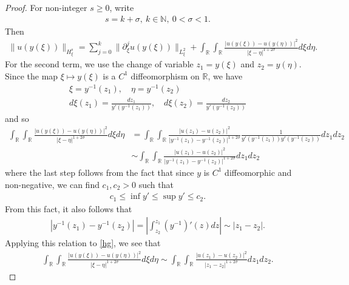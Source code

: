 \documentclass[12pt,reqno]{amsart}
\numberwithin{equation}{section}  %
\numberwithin{figure}{section}
\newcommand{\rr}{\mathbb{R}}
\newcommand{\p}{\partial}
\begin{document}
\begin{proof}
For non-integer $s \ge 0$, write
%
%
\begin{equation*}
\begin{split}
  s = k + \sigma, \ k \in \mathbb{N}, \ 0 < \sigma < 1. 
\end{split}
\end{equation*}
%
%
Then 
%
%
\begin{equation*}
\begin{split}
  \| u(y(\xi)) \|_{H^{s}_{\xi}} = \sum_{j = 0}^{k} \| \p_{\xi}^{j} u (y(\xi))
  \|_{L^{2}_{\xi}} + \int_{\rr} \int_{\rr} \frac{| u(y(\xi)) - u(y(\eta))
    |^{2}}{| \xi - \eta |^{1 + 2 \sigma}} d \xi d \eta.
\end{split}
\end{equation*}
%
%
For the second term, we use the change of variable $z_{1} = y(\xi)$ and $z_{2} = y(\eta)$. Since the map $\xi \mapsto y(\xi)$ is a $C^{1}$ diffeomorphism on $\rr$, we have
%
%
\begin{gather*}
   \xi= y^{-1}(z_{1}), \quad \eta = y^{-1}(z_{2})
  \\
   d \xi(z_{1}) = \frac{dz_{1}}{y'(y^{-1}(z_{1}))}, \quad d \xi(z_{2}) = \frac{dz_{2}}{y'(y^{-1}(z_{2}))}
\end{gather*}
%
%
and so
%
%
\begin{equation}
  \label{hg}
\begin{split}
\int_{\rr} \int_{\rr} \frac{| u(y(\xi)) - u(y(\eta))
    |^{2}}{| \xi - \eta |^{1 + 2 \sigma}} d \xi d \eta & = \int_{\rr} \int_{\rr}
    \frac{| u(z_{1}) - u(z_{2}) |^{2}}{| y^{-1}(z_{1}) - y^{-1}(z_{2}) |^{1 + 2
    \sigma}} \frac{1}{y'(y^{-1}(z_{1})) y'(y^{-1}(z_{2}))} d z_{1} d z_{2}
    \\
    & \sim \int_{\rr} \int_{\rr} \frac{| u(z_{1}) - u(z_{2}) |^{2}}{|
      y^{-1}(z_{1}) - y^{-1}(z_{2}) |^{1 + 2 \sigma}} d z_{1} dz_{2}
\end{split}
\end{equation}
%
%
where the last step follows from the fact that since $y$ is $C^{1}$
diffeomorphic  and non-negative, we can find $c_{1}, c_{2} > 0$ such that
%
%
\begin{equation*}
\begin{split}
  c_{1} \le \inf y' \le \sup y' \le c_{2}.
\end{split}
\end{equation*}
%
%
From this fact, it also follows that
%
%
\begin{equation*}
\begin{split}
  | y^{-1}(z_{1}) - y^{-1}(z_{2}) | = | \int_{z_{2}}^{z_{1}} (y^{-1})'(z) dz | \sim | z_{1} - z_{2} |.
\end{split}
\end{equation*}
%
%
Applying this relation to \eqref{hg}, we see that
%
%
\begin{equation*}
\begin{split}
\int_{\rr} \int_{\rr} \frac{| u(y(\xi)) - u(y(\eta))
    |^{2}}{| \xi - \eta |^{1 + 2 \sigma}} d \xi d \eta
    \sim 
\int_{\rr} \int_{\rr} \frac{| u(z_{1}) - u(z_{2}) |^{2}}{| z_{1} - z_{2} |^{1 + 2 \sigma}} d z_{1} dz_{2}.
\end{split}
\end{equation*}
%
%
\end{proof}
%
%
\end{document}

